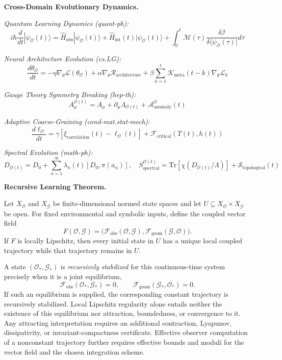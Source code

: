 \begin{scholium}
\vspace{1em}
\noindent\textbf{Cross-Domain Evolutionary Dynamics.}

\textit{Quantum Learning Dynamics (quant-ph):}
\[
i\hbar \frac{d}{dt}|\psi_{\mathcal{O}}(t)\rangle = \hat{H}_{\text{obs}}|\psi_{\mathcal{O}}(t)\rangle + \hat{H}_{\text{int}}(t)|\psi_{\mathcal{O}}(t)\rangle + \int_0^t \mathcal{M}(\tau) \frac{\delta \mathcal{I}}{\delta \langle \psi_{\mathcal{O}}(\tau)|} d\tau
\]

\textit{Neural Architecture Evolution (cs.LG):}
\[
\frac{d\theta_{\mathcal{O}}}{dt} = -\eta \nabla_\theta \mathcal{L}(\theta_{\mathcal{O}}) + \alpha \nabla_\theta \mathcal{R}_{\text{architecture}} + \beta \sum_{k=1}^{t} \mathcal{K}_{\text{meta}}(t-k) \nabla_\theta \mathcal{L}_k
\]

\textit{Gauge Theory Symmetry Breaking (hep-th):}
\[
A_\mu^{\mathcal{O}(t)} = A_\mu + \partial_\mu \Lambda_{\mathcal{O}(t)} + \mathcal{A}_{\text{anomaly}}^{\mathcal{O}}(t)
\]

\textit{Adaptive Coarse-Graining (cond-mat.stat-mech):}
\[
\frac{d\ell_{\mathcal{O}}}{dt} = \gamma[\xi_{\text{correlation}}(t) - \ell_{\mathcal{O}}(t)] + \mathcal{F}_{\text{critical}}(T(t), h(t))
\]

\textit{Spectral Evolution (math-ph):}
\[
D_{\mathcal{O}(t)} = D_0 + \sum_{n=1}^{\infty} \lambda_n(t) [D_0, \pi(a_n)], \quad S_{\text{spectral}}^{\mathcal{O}(t)} = \text{Tr}[\chi(D_{\mathcal{O}(t)}/\Lambda)] + \mathcal{S}_{\text{topological}}(t)
\]

\vspace{1em}
\noindent\textbf{Recursive Learning Theorem.}

\begin{theorem}
\label{theorem:bk4_observer_geometry_coevolution}
Let $X_{\mathcal O}$ and $X_{\mathcal G}$ be finite-dimensional normed state
spaces and let $U\subseteq X_{\mathcal O}\times X_{\mathcal G}$ be open.  For
fixed environmental and symbolic inputs, define the coupled vector field
\[
 F(\mathcal O,\mathcal G)
 =\bigl(\mathcal F_{\mathrm{obs}}(\mathcal O,\mathcal G),
        \mathcal F_{\mathrm{geom}}(\mathcal G,\mathcal O)\bigr).
\]
If $F$ is locally Lipschitz, then every initial state in $U$ has a unique local
coupled trajectory while that trajectory remains in $U$.

A state $(\mathcal O_*,\mathcal G_*)$ is \emph{recursively stabilized} for this
continuous-time system precisely when it is a joint equilibrium,
\[
 \mathcal F_{\mathrm{obs}}(\mathcal O_*,\mathcal G_*)=0,
 \qquad
 \mathcal F_{\mathrm{geom}}(\mathcal G_*,\mathcal O_*)=0.
\]
If such an equilibrium is supplied, the corresponding constant trajectory is
recursively stabilized.  Local Lipschitz regularity alone entails neither the
existence of this equilibrium nor attraction, boundedness, or convergence to
it.  Any attracting interpretation requires an additional contraction,
Lyapunov, dissipativity, or invariant-compactness certificate.  Effective
observer computation of a nonconstant trajectory further requires effective
bounds and moduli for the vector field and the chosen integration scheme.
\end{theorem}


\end{scholium}
